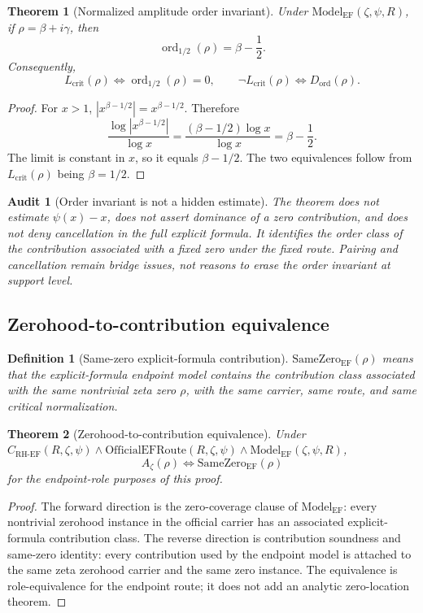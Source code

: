 \documentclass[11pt]{article}
\newtheorem{definition}{Definition}[section]
\newtheorem{theorem}{Theorem}[section]
\newtheorem{audit}{Audit}[section]
\newcommand{\Az}{A_{\zeta}}
\newcommand{\Lcrit}{L_{\mathrm{crit}}}
\newcommand{\CRHEF}{C_{\mathrm{RH}\text{-}\mathrm{EF}}}
\newcommand{\ModelEF}{\mathrm{Model}_{\mathrm{EF}}}
\newcommand{\OfficialEFRoute}{\mathrm{OfficialEFRoute}}
\newcommand{\ordhalf}{\operatorname{ord}_{1/2}}
\newcommand{\Dord}{D_{\mathrm{ord}}}
\newcommand{\SameZeroEF}{\mathrm{SameZero}_{\mathrm{EF}}}
\begin{document}
\begin{theorem}[Normalized amplitude order invariant]
Under \(\ModelEF(\zeta,\psi,R)\), if \(\rho=\beta+i\gamma\), then
\[
\ordhalf(\rho)=\beta-\frac12.
\]
Consequently,
\[
\Lcrit(\rho)\Longleftrightarrow \ordhalf(\rho)=0,
\qquad
\neg\Lcrit(\rho)\Longleftrightarrow \Dord(\rho).
\]
\end{theorem}

\begin{proof}
For \(x>1\), \(|x^{\beta-1/2}|=x^{\beta-1/2}\).  Therefore
\[
\frac{\log |x^{\beta-1/2}|}{\log x}=\frac{(\beta-1/2)\log x}{\log x}=\beta-\frac12.
\]
The limit is constant in \(x\), so it equals \(\beta-1/2\).  The two equivalences follow from \(\Lcrit(\rho)\) being \(\beta=1/2\).
\end{proof}

\begin{audit}[Order invariant is not a hidden estimate]
The theorem does not estimate \(\psi(x)-x\), does not assert dominance of a zero contribution, and does not deny cancellation in the full explicit formula.  It identifies the order class of the contribution associated with a fixed zero under the fixed route.  Pairing and cancellation remain bridge issues, not reasons to erase the order invariant at support level.
\end{audit}

\subsection{Zerohood-to-contribution equivalence}

\begin{definition}[Same-zero explicit-formula contribution]
\(\SameZeroEF(\rho)\) means that the explicit-formula endpoint model contains the contribution class associated with the same nontrivial zeta zero \(\rho\), with the same carrier, same route, and same critical normalization.
\end{definition}

\begin{theorem}[Zerohood-to-contribution equivalence]
Under \(\CRHEF(R,\zeta,\psi)\wedge \OfficialEFRoute(R,\zeta,\psi)\wedge \ModelEF(\zeta,\psi,R)\),
\[
\Az(\rho)\Longleftrightarrow \SameZeroEF(\rho)
\]
for the endpoint-role purposes of this proof.
\end{theorem}

\begin{proof}
The forward direction is the zero-coverage clause of \(\ModelEF\): every nontrivial zerohood instance in the official carrier has an associated explicit-formula contribution class.  The reverse direction is contribution soundness and same-zero identity: every contribution used by the endpoint model is attached to the same zeta zerohood carrier and the same zero instance.  The equivalence is role-equivalence for the endpoint route; it does not add an analytic zero-location theorem.
\end{proof}
\end{document}
